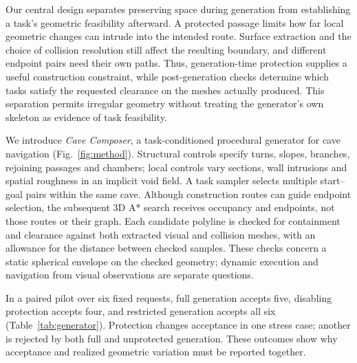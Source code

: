 Our central design separates preserving space during generation from establishing
a task's geometric feasibility afterward. A protected passage limits how far
local geometric changes can intrude into the intended route. Surface extraction
and the choice of collision resolution still affect the resulting boundary,
and different endpoint pairs need their own paths. Thus, generation-time
protection supplies a useful construction constraint, while post-generation
checks determine which tasks satisfy the requested clearance on the meshes
actually produced. This separation permits irregular geometry without treating
the generator's own skeleton as evidence of task feasibility.

We introduce \emph{Cave Composer}, a task-conditioned procedural generator for
cave navigation (Fig.~\ref{fig:method}). Structural controls specify turns,
slopes, branches, rejoining passages and chambers; local controls vary sections,
wall intrusions and spatial roughness in an implicit void field. A task sampler
selects multiple start--goal pairs within the same cave. Although construction
routes can guide endpoint selection, the subsequent 3D A* search receives
occupancy and endpoints, not those routes or their graph. Each candidate polyline
is checked for containment and clearance against both extracted visual and
collision meshes, with an allowance for the distance between checked samples.
These checks concern a static spherical envelope on the checked geometry;
dynamic execution and navigation from visual observations are separate questions.

In a paired pilot over six fixed requests, full generation accepts five,
disabling protection accepts four, and restricted generation accepts all six
(Table~\ref{tab:generator}). Protection changes acceptance in one stress case;
another is rejected by both full and unprotected generation. These outcomes
show why acceptance and realized geometric variation must be reported together.

